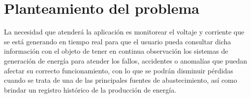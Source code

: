 
\section{Planteamiento del problema}

La necesidad que atenderá la aplicación es monitorear el voltaje y corriente que se está generando en tiempo real para que el usuario pueda consultar dicha información con el objeto de tener en continua observación los sistemas de generación de energía para atender los fallos, accidentes o anomalías que puedan afectar su correcto funcionamiento, con lo que se podrán disminuir pérdidas cuando se trata de una de las principales fuentes de abastecimiento, así como brindar un registro histórico de la producción de energía.

